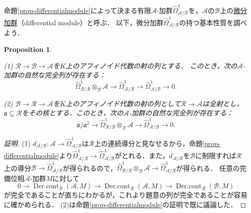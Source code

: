 \documentclass[a4paper,12pt, dvipdfmx]{jsbook}
\def\Dercont{\mathop{\mathrm{Der.cont}}\nolimits}
\theoremstyle{plain}
\newtheorem{prop}[thm]{\bfseries Proposition}
\theoremstyle{definition}
\begin{document}
命題\ref{prop-differentialmodule}によって決まる有限$\mathcal{A}$-加群$\widehat{\Omega}^1_{\mathcal{A}/\mathcal{B}}$を，$\mathcal{A}$の$\mathcal{B}$上の\underline{微分加群}（differential module）と呼ぶ．
以下，微分加群$\widehat{\Omega}^1_{\mathcal{A}/\mathcal{B}}$の持つ基本性質を調べよう．
\begin{prop}\label{prop-differentialmoduls3}{\rm 
(1) $\mathcal{R}\rightarrow\mathcal{B}\rightarrow\mathcal{A}$を$K$上のアフィノイド代数の射の列とする．
このとき，次の$\mathcal{A}$-加群の自然な完全列が存在する：
$$
\widehat{\Omega}^1_{\mathcal{B}/\mathcal{R}}\otimes_{\mathcal{B}}\mathcal{A}\longrightarrow\widehat{\Omega}^1_{\mathcal{A}/\mathcal{R}}\longrightarrow\widehat{\Omega}^1_{\mathcal{A}/\mathcal{B}}\longrightarrow 0.
$$

(2) $\mathcal{B}\rightarrow\mathcal{R}\rightarrow\mathcal{A}$を$K$上のアフィノイド代数の射の列として$\mathcal{R}\rightarrow\mathcal{A}$は全射とし，$\mathfrak{a}\subseteq\mathcal{R}$をその核とする．このとき，次の$\mathcal{A}$-加群の自然な完全列が存在する：
$$
\mathfrak{a}/\mathfrak{a}^2\longrightarrow\widehat{\Omega}^1_{\mathcal{R}/\mathcal{B}}\otimes_{\mathcal{R}}\mathcal{A}\longrightarrow\widehat{\Omega}^1_{\mathcal{A}/\mathcal{B}}\longrightarrow 0.
$$}
\end{prop}

\begin{proof}[証明]
(1) $d_{\mathcal{A}/\mathcal{B}}\colon\mathcal{A}\rightarrow\widehat{\Omega}^1_{\mathcal{A}/\mathcal{B}}$は$\mathcal{R}$上の連続導分と見なせるから，命題\ref{prop-differentialmodule}より$\widehat{\Omega}^1_{\mathcal{A}/\mathcal{R}}\rightarrow\widehat{\Omega}^1_{\mathcal{A}/\mathcal{B}}$がとれる．また，$d_{\mathcal{A}/\mathcal{R}}$を$\mathcal{B}$に制限すれば$\mathcal{R}$上の導分$\mathcal{B}\rightarrow\widehat{\Omega}^1_{\mathcal{A}/\mathcal{R}}$が得られるので，$\widehat{\Omega}^1_{\mathcal{B}/\mathcal{R}}\otimes_{\mathcal{B}}\mathcal{A}\longrightarrow\widehat{\Omega}^1_{\mathcal{A}/\mathcal{R}}$が得られる．
任意の完備位相$\mathcal{A}$-加群$M$に対して
$$
0\longrightarrow\Dercont_{\mathcal{B}}(\mathcal{A},M)\longrightarrow\Dercont_{\mathcal{R}}(\mathcal{A},M)\longrightarrow\Dercont_{\mathcal{R}}(\mathcal{B},M)
$$
が完全であることが直ちにわかるが，これより題意の列が完全であることが容易に確かめられる．
(2)は命題\ref{prop-differentialmodule}の証明で既に議論した．
\end{proof}
\end{document}
